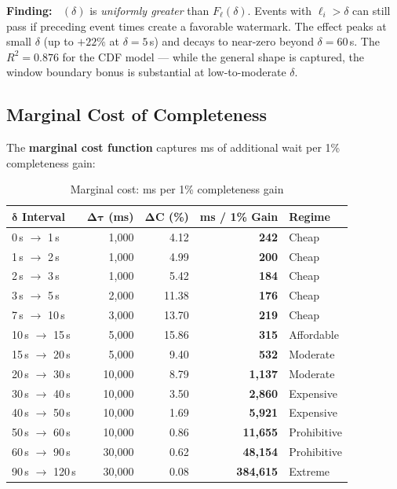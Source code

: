\documentclass[11pt,a4paper]{article}
\DeclareMathOperator{\Cstrict}{C_{\text{strict}}}
\newcommand{\lateness}{\ell}
\begin{document}
\textbf{Finding:} $\Cstrict(\delta)$ is \textit{uniformly greater} than $F_\ell(\delta)$.
Events with $\lateness_i > \delta$ can still pass if preceding event times create a favorable watermark.
The effect peaks at small $\delta$ (up to $+22\%$ at $\delta{=}5$\,s) and decays to near-zero beyond $\delta{=}60$\,s.
The $R^2 = 0.876$ for the CDF model --- while the general shape is captured, the window boundary bonus is substantial at low-to-moderate $\delta$.

\subsection{Marginal Cost of Completeness}

The \textbf{marginal cost function} captures ms of additional wait per 1\% completeness gain:

\begin{table}[H]
\centering
\caption{Marginal cost: ms per 1\% completeness gain}
\label{tab:marginal-cost}
\begin{tabular}{lrrrl}
\toprule
$\bm{\delta}$ \textbf{Interval} & $\bm{\Delta\tau}$ \textbf{(ms)} & $\bm{\Delta C}$ \textbf{(\%)} & \textbf{ms / 1\% Gain} & \textbf{Regime} \\
\midrule
0\,s $\to$ 1\,s    & 1,000  & 4.12   & \textbf{242}      & Cheap \\
1\,s $\to$ 2\,s    & 1,000  & 4.99   & \textbf{200}      & Cheap \\
2\,s $\to$ 3\,s    & 1,000  & 5.42   & \textbf{184}      & Cheap \\
3\,s $\to$ 5\,s    & 2,000  & 11.38  & \textbf{176}      & Cheap \\
7\,s $\to$ 10\,s   & 3,000  & 13.70  & \textbf{219}      & Cheap \\
10\,s $\to$ 15\,s  & 5,000  & 15.86  & \textbf{315}      & Affordable \\
15\,s $\to$ 20\,s  & 5,000  & 9.40   & \textbf{532}      & Moderate \\
20\,s $\to$ 30\,s  & 10,000 & 8.79   & \textbf{1,137}    & Moderate \\
30\,s $\to$ 40\,s  & 10,000 & 3.50   & \textbf{2,860}    & Expensive \\
40\,s $\to$ 50\,s  & 10,000 & 1.69   & \textbf{5,921}    & Expensive \\
50\,s $\to$ 60\,s  & 10,000 & 0.86   & \textbf{11,655}   & Prohibitive \\
60\,s $\to$ 90\,s  & 30,000 & 0.62   & \textbf{48,154}   & Prohibitive \\
90\,s $\to$ 120\,s & 30,000 & 0.08   & \textbf{384,615}  & Extreme \\
\bottomrule
\end{tabular}
\end{table}
\end{document}
